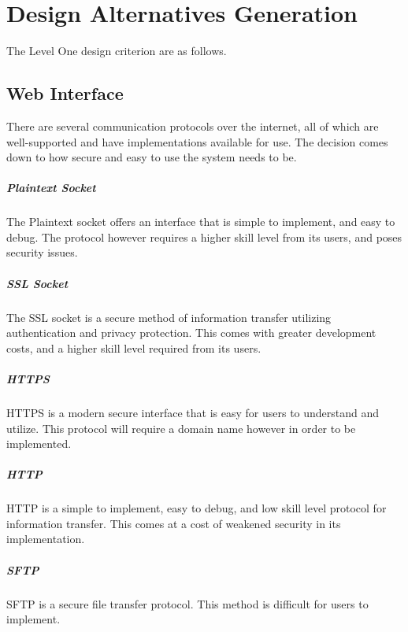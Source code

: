 \chapter{Design Alternatives Generation}
The Level One design criterion are as follows. 

\section{Web Interface}
There are several communication protocols over the internet, all of which are well-supported and have implementations available for use. 
The decision comes down to how secure and easy to use the system needs to be.

\paragraph{Plaintext Socket} 
The Plaintext socket offers an interface that is simple to implement, and easy to debug.
The protocol however requires a higher skill level from its users, and poses security issues.

\paragraph{SSL Socket} 
The SSL socket is a secure method of information transfer utilizing authentication and privacy protection.
This comes with greater development costs, and a higher skill level required from its users. 

\paragraph{HTTPS} 
HTTPS is a modern secure interface that is easy for users to understand and utilize.
This protocol will require a domain name however in order to be implemented.

\paragraph{HTTP}
HTTP is a simple to implement, easy to debug, and low skill level protocol for information transfer.
This comes at a cost of weakened security in its implementation.

\paragraph{SFTP}
SFTP is a secure file transfer protocol.
This method is difficult for users to implement.


